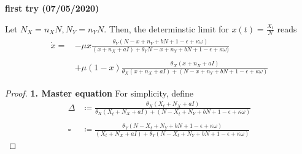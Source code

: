 \textbf{first try (07/05/2020)}
\begin{prop}\label{result}
	Let $N_X = n_X N, N_Y = n_Y N$. Then, the determinstic limit for $x\left(t\right) = \frac{X_t}{N}$ reads
	\begin{align}
	\begin{split}
	\dot{x} = &-\mu x\frac{\theta_Y(N-x+n_Y + bN +1-\epsilon+\kappa\omega)}{(x + n_X+aI) + \theta_YN-x+n_Y + bN +1-\epsilon+\kappa\omega)} \\
	&\\
	\qquad &+ \mu\left(1-x\right)\frac{\theta_X (x + n_X + aI)}{\theta_X (x + n_X + aI) + (N-x + n_Y + bN + 1-\epsilon + \kappa\omega)}
		\end{split}
	\end{align} 
\end{prop}
\begin{proof}\phantom{lol}\newline
\textbf{1. Master equation}\newline
For simplicity, define
\begin{align*}
\Delta &\coloneqq\frac{\theta_X (X_t + N_X + aI)}{\theta_X (X_t + N_X + aI) + (N-X_t + N_Y + bN + 1-\epsilon + \kappa\omega)} \\
&\\
\square &\coloneqq\frac{\theta_Y(N-X_t + N_Y + bN +1-\epsilon+\kappa\omega)}{(X_t + N_X + aI) + \theta_Y(N-X_t + N_Y + bN +1-\epsilon+\kappa\omega)}
\end{align*}


\end{proof}
